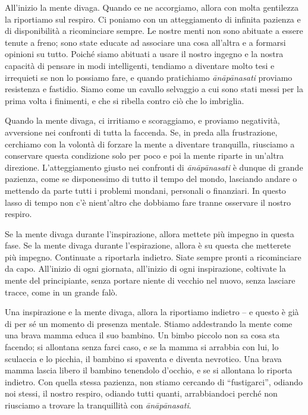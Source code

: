 All'inizio la mente divaga. Quando ce ne accorgiamo, allora con molta
gentilezza la riportiamo sul respiro. Ci poniamo con un atteggiamento di
infinita pazienza e di disponibilità a ricominciare sempre. Le nostre
menti non sono abituate a essere tenute a freno; sono state educate ad
associare una cosa all'altra e a formarsi opinioni su tutto. Poiché
siamo abituati a usare il nostro ingegno e la nostra capacità di pensare
in modi intelligenti, tendiamo a diventare molto tesi e irrequieti se
non lo possiamo fare, e quando pratichiamo \emph{ānāpānasati} proviamo
resistenza e fastidio. Siamo come un cavallo selvaggio a cui sono stati
messi per la prima volta i finimenti, e che si ribella contro ciò che lo
imbriglia.

Quando la mente divaga, ci irritiamo e scoraggiamo, e proviamo
negatività, avversione nei confronti di tutta la faccenda. Se, in preda
alla frustrazione, cerchiamo con la volontà di forzare la mente a
diventare tranquilla, riusciamo a conservare questa condizione solo per
poco e poi la mente riparte in un'altra direzione. L'atteggiamento
giusto nei confronti di \emph{ānāpānasati} è dunque di grande pazienza,
come se disponessimo di tutto il tempo del mondo, lasciando andare o
mettendo da parte tutti i problemi mondani, personali o finanziari. In
questo lasso di tempo non c'è nient'altro che dobbiamo fare tranne
osservare il nostro respiro.

Se la mente divaga durante l'inspirazione, allora mettete più impegno in
questa fase. Se la mente divaga durante l'espirazione, allora è su
questa che metterete più impegno. Continuate a riportarla indietro.
Siate sempre pronti a ricominciare da capo. All'inizio di ogni giornata,
all'inizio di ogni inspirazione, coltivate la mente del principiante,
senza portare niente di vecchio nel nuovo, senza lasciare tracce, come
in un grande falò.

Una inspirazione e la mente divaga, allora la riportiamo indietro -- e
questo è già di per sé un momento di presenza mentale. Stiamo
addestrando la mente come una brava mamma educa il suo bambino. Un bimbo
piccolo non sa cosa sta facendo; si allontana senza farci caso, e se la
mamma si arrabbia con lui, lo sculaccia e lo picchia, il bambino si
spaventa e diventa nevrotico. Una brava mamma lascia libero il bambino
tenendolo d'occhio, e se si allontana lo riporta indietro. Con quella
stessa pazienza, non stiamo cercando di ``fustigarci'', odiando noi
stessi, il nostro respiro, odiando tutti quanti, arrabbiandoci perché
non riusciamo a trovare la tranquillità con \emph{ānāpānasati}.

